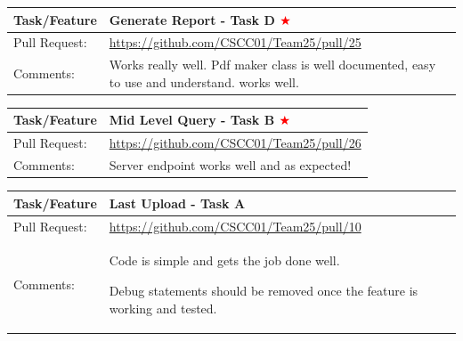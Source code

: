 \documentclass[12pt]{article}
\begin{document}
\begin{table}[H]
\begin{tabular}{|p{3cm}|p{11cm}|}
\hline
Task/Feature  & Generate Report - Task D \textcolor{red}{$\bigstar$}
 \\ \hline
Pull Request: & \url{https://github.com/CSCC01/Team25/pull/25}                                                                                                                                                                                                                                                                                                                      \\ \hline
Comments:     & Works really well. Pdf maker class is well documented, easy to use and understand.  works well.
 \\ \hline
\end{tabular}
\end{table}

\begin{table}[H]
\begin{tabular}{|p{3cm}|p{11cm}|}
\hline
Task/Feature  & Mid Level Query - Task B \textcolor{red}{$\bigstar$}
 \\ \hline
Pull Request: & \url{https://github.com/CSCC01/Team25/pull/26}                                                                                                                                                                                                                                                                                                                      \\ \hline
Comments:     & Server endpoint works well and as expected!
 \\ \hline
\end{tabular}
\end{table}

\begin{table}[H]
\begin{tabular}{|p{3cm}|p{11cm}|}
\hline
Task/Feature  & Last Upload - Task A
 \\ \hline
Pull Request: & \url{https://github.com/CSCC01/Team25/pull/10}                                                                                                                                                                                                                                                                                                                      \\ \hline

Comments:     & Code is simple and gets the job done well.

Debug statements should be removed once the feature is working and tested.

 \\ \hline
\end{tabular}
\end{table}
\end{document}
